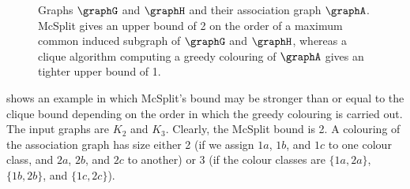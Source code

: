 \begin{figure}[h!]
\centering
{}
\qquad\quad
{}
\qquad\quad
{}
\qquad

\caption{Graphs $\graphG$ and $\graphH$ and their association graph $\graphA$.  McSplit
    gives an upper bound of 2 on the order of a maximum common induced subgraph
    of $\graphG$ and $\graphH$, whereas a clique algorithm computing
    a greedy colouring of $\graphA$ gives an tighter upper bound of 1.}
\label{fig:clique-better-bound}
\end{figure}

 shows an example in which McSplit's bound
may be stronger than or equal to the clique bound depending on the order in
which the greedy colouring is carried out.  The input graphs are $K_2$ and
$K_3$.  Clearly, the McSplit bound is 2.  A colouring of the association
graph has size either 2 (if we assign $1a$, $1b$, and $1c$
to one colour class, and $2a$, $2b$, and $2c$ to another) or 3 (if the
colour classes are $\{1a,2a\}$, $\{1b,2b\}$, and $\{1c,2c\}$).

